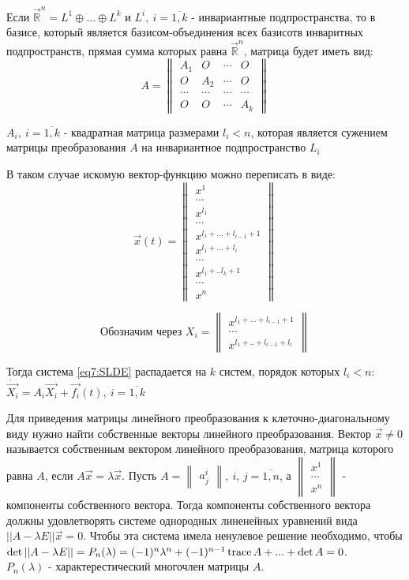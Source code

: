 Если $\vec{\mathbb{R}}^n = L^1 \oplus ... \oplus L^k$ и $L^i, ~i = \overline{1, k}$ - инвариантные подпространства, то в базисе, который является базисом-объединения всех базисотв инваритных подпространств, прямая сумма которых равна $\vec{\mathbb{R}}^n$, матрица будет иметь вид:
\[A = \begin{Vmatrix} A_1 & O & \cdots & O \\ O & A_2 & \cdots & O \\ \cdots & \cdots & \cdots & \cdots \\ O & O &\cdots & A_k \end{Vmatrix} \] 

$A_i, ~i = \overline{1, k}$ - квадратная матрица размерами $l_i < n$, которая является сужением матрицы преобразования $A$ на инвариантное подпространство $L_i$

В таком случае искомую вектор-функцию можно переписать в виде: 
\[ \vec{x}(t) = \begin{Vmatrix} x^1 \\ \cdots \\ x^{l_1} \\ \cdots \\ x^{l_1 + ... + l_{i-1} + 1} \\ x^{l_1 + ... + l_{i}} \\ \cdots \\ x^{l_1 + .. l_k + 1} \\ \cdots \\ x^n \end{Vmatrix}\]

\[\text{Обозначим через } X_i = \begin{Vmatrix} x^{l_1 + ... + l_{i-1} + 1} \\ \cdots \\ x^{l_1 + .. + l_{i-1} + l_{i}}\end{Vmatrix} \]

Тогда система \eqref{eq7:SLDE} распадается на $k$ систем, порядок которых $l_i < n$: \\
$\dot{\vec{X_i}} = A_i \vec{X_i} + \vec{f_i}(t), ~i =\overline{1, k}$

Для приведения матрицы линейного преобразования к клеточно-диагональному виду нужно найти собственные векторы линейного преобразования. 
Вектор $\vec{x} \neq 0$ называется собственным вектором линейного преобразования, матрица которого равна $A$, если $A\vec{x} = \lambda \vec{x}$. 
Пусть $A = \begin{Vmatrix} a_j^i \end{Vmatrix}, ~i,\,j = \overline{1, n}$, а $\begin{Vmatrix} x^1 \\ \cdots \\ x^n \end{Vmatrix}$ - компоненты собственного вектора.
Тогда компоненты собственного вектора должны удовлетворять системе однородных линенейных уравнений вида $|| A - \lambda E|| \vec{x} = 0$. 
Чтобы эта система имела ненулевое решение необходимо, чтобы $\det || A - \lambda E|| = P_n(\lambda) = (-1)^n \lambda^n + (-1)^{n-1} \operatorname{trace} A + ... + \det A = 0$. \\
$P_n(\lambda)$ - характерестический многочлен матрицы $A$. 

